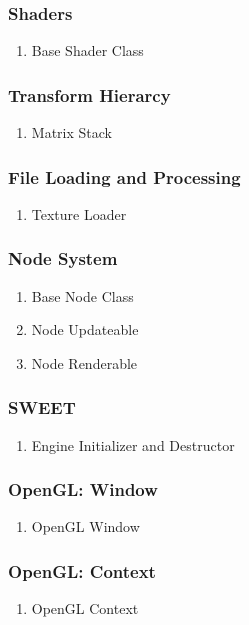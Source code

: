 \subsubsection{Shaders}
\begin{enumerate}
\item Base Shader Class
\end{enumerate}
\subsubsection{Transform Hierarcy}
\begin{enumerate}
\item Matrix Stack
\end{enumerate}
\subsubsection{File Loading and Processing}
\begin{enumerate}
\item Texture Loader
\end{enumerate}
\subsubsection{Node System}
\begin{enumerate}
\item Base Node Class
\item Node Updateable
\item Node Renderable
\end{enumerate}
\subsubsection{SWEET}
\begin{enumerate}
\item Engine Initializer and Destructor
\end{enumerate}
\subsubsection{OpenGL: Window}
\begin{enumerate}
\item OpenGL Window
\end{enumerate}
\subsubsection{OpenGL: Context}
\begin{enumerate}
\item OpenGL Context
\end{enumerate}

